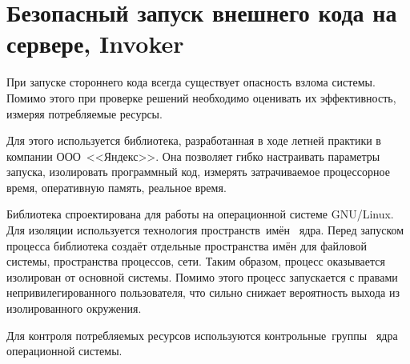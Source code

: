 \section{Безопасный запуск внешнего кода на сервере, Invoker}
При запуске стороннего кода всегда
существует опасность взлома системы.
Помимо этого при проверке решений необходимо
оценивать их эффективность, измеряя потребляемые ресурсы.

Для этого используется библиотека,
разработанная в ходе летней практики в компании ООО~<<Яндекс>>.
Она позволяет гибко настраивать параметры запуска,
изолировать программный код, измерять затрачиваемое процессорное время,
оперативную память, реальное время.

Библиотека спроектирована для работы на операционной системе GNU/Linux.
Для изоляции используется технология пространств~имён~\cite{linuxns} ядра.
Перед запуском процесса библиотека создаёт отдельные пространства
имён для файловой системы, пространства процессов, сети. Таким образом,
процесс оказывается изолирован от основной системы.
Помимо этого процесс запускается с правами непривилегированного пользователя,
что сильно снижает вероятность выхода из изолированного окружения.

Для контроля потребляемых ресурсов используются контрольные~группы~\cite{linuxcgroups}
ядра операционной системы.
